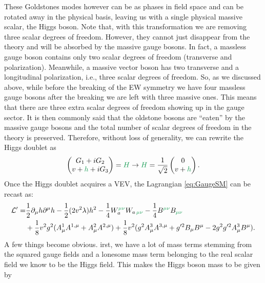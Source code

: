 These Goldstones modes\Joaoadd{,} however\Joaoadd{,} can  be  as phases in  field space and  can be rotated away in the physical basis, leaving us with a single physical massive scalar, the Higgs boson. Note that, with this transformation we are removing three scalar degrees of freedom.  However, they cannot just disappear from the theory and will be absorbed by the massive gauge bosons.
%
In fact, a massless gauge boson contains only two scalar degrees of freedom (transverse and polarization). Meanwhile, a massive vector boson has two transverse and a longitudinal polarization, i.e., three scalar degrees of freedom. So, as we discussed above, while before the breaking of the EW symmetry we have four massless gauge bosons  after the breaking we are left with three massive ones. This means that there are three extra scalar degrees of freedom showing up in the gauge sector. It is then commonly said that the oldstone bosons are ``eaten'' by the massive gauge bosons and the total number of scalar degrees of freedom in the theory is preserved. Therefore, without loss of generality, we can rewrite the Higgs doublet as
%
\begin{equation}
 \begin{pmatrix}
G_1 + i G_2 \\ 
v + \Joaoadd{h} + i G_3 
\end{pmatrix} = \Joaoadd{H} \rightarrow \Joaoadd{H}  =  \frac{1}{\sqrt{2}} \begin{pmatrix}
0 \\ 
v + \Joaoadd{h} 
\end{pmatrix}.
\label{shame}%
\end{equation}
Once the Higgs doublet acquires a VEV, the Lagrangian \eqref{eq:GaugeSM} can be recast as:
%
\begin{align}
\mathcal{L}^\prime = & \frac{1}{2} \partial_\mu h \partial^\mu h - \frac{1}{2} (2v^2 \lambda) h^2
 - \frac{1}{4}  W^{\Joaoadd{\mu\nu}}_a W_{a \,\Joaoadd{\mu\nu}}  
- \frac{1}{4}  B^{\Joaoadd{\mu\nu}} B_{\Joaoadd{\mu\nu}}  \nonumber \\
& + \frac{1}{8} v^2 g^2 (A^1_\mu A^{1,\mu}+ A^2_\mu A^{2,\mu}) +  \frac{1}{8} v^2  (g^2  A^3_\mu A^{3,\mu} + g^{\prime 2} B_\mu B^\mu - 2 g^2 g^{\prime 2} A^3_\mu B^\mu ). 
\label{complicatedpart}
\end{align}
%
A few things become obvious. irst, we have a lot of mass terms  stemming from the squared gauge fields and a lonesome  mass term belonging to the real scalar field we know to be the Higgs field. This makes the Higgs boson mass  to be given by
